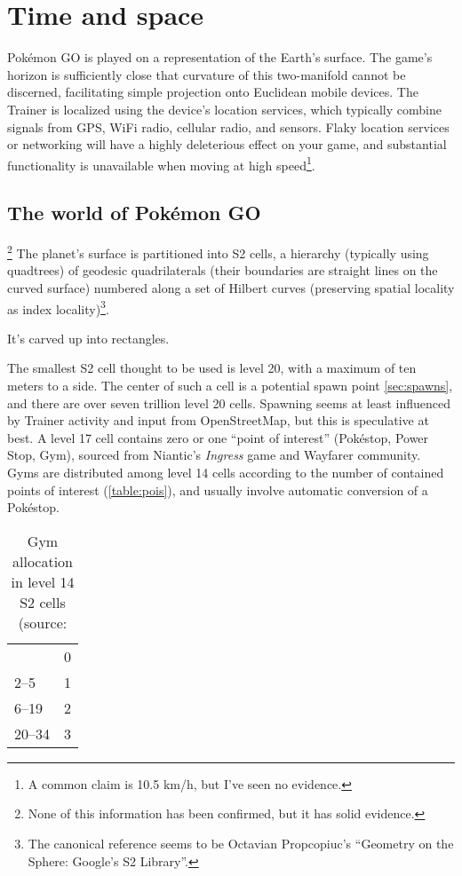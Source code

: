\chapter{Time and space\label{chap:timespace}}
Pokémon GO is played on a representation of the Earth's surface.
The game's horizon is sufficiently close that curvature of this two-manifold
 cannot be discerned, facilitating simple projection onto Euclidean mobile devices.
The Trainer is localized using the device's location services, which typically
 combine signals from GPS, WiFi radio, cellular radio, and sensors.
Flaky location services or networking will have a highly deleterious effect on your game,
 and substantial functionality is unavailable when moving at high speed\footnote{A common
 claim is 10.5 km/h, but I've seen no evidence.}.

\section{The world of Pokémon GO\label{sec:world}}\footnote{None of this information has been confirmed, but it has solid evidence.}
The planet's surface is partitioned into S2 cells, a hierarchy (typically using
 quadtrees) of geodesic quadrilaterals (their boundaries are straight lines on the curved
 surface) numbered along a set of Hilbert curves (preserving spatial locality as index locality)\footnote{The
 canonical reference seems to be Octavian Propcopiuc's ``Geometry on the Sphere: Google's S2 Library''.}.
\begin{tipbox}[title=If that meant nothing to you…]
It's carved up into rectangles.
\end{tipbox}
The smallest S2 cell thought to be used is level 20, with a maximum of ten meters to a side.
The center of such a cell is a potential spawn point \autoref{sec:spawns}, and there are over seven trillion level 20 cells.
Spawning seems at least influenced by Trainer activity and input from OpenStreetMap, but this is speculative at best.
A level 17 cell contains zero or one ``point of interest'' (Pokéstop, Power Stop, Gym),
 sourced from Niantic's \textit{Ingress} game and Wayfarer community.
Gyms are distributed among level 14 cells according to the number of contained points of interest (\autoref{table:pois}),
 and usually involve automatic conversion of a Pokéstop.
\begin{table}
\centering
\begin{tabular}{lr}
\Midrule
1 & 0 \\
2--5 & 1\\
6--19 & 2\\
20--34 & 3\\
\end{tabular}
\caption[Gym allocation in level 14 S2 cells]{Gym allocation in level 14 S2 cells (source: \label{table:pois}}
\end{table}
